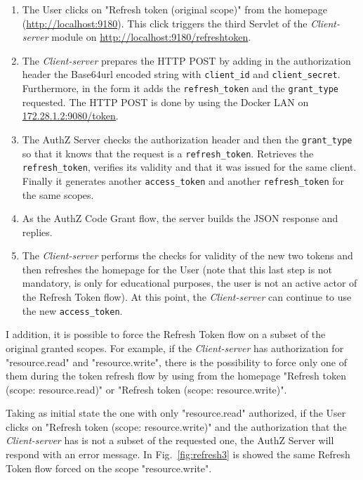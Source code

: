 \begin{enumerate}
    \item The User clicks on "Refresh token (original scope)" from the homepage (\url{http://localhost:9180}). This click triggers the third Servlet of the \textit{Client-server} module on \url{http://localhost:9180/refreshtoken}.
    \item The \textit{Client-server} prepares the HTTP POST by adding in the authorization header the Base64url encoded string with \texttt{client\_id} and \texttt{client\_secret}. Furthermore, in the form it adds the \texttt{refresh\_token} and the \texttt{grant\_type} requested. The HTTP POST is done by using the Docker LAN on \url{172.28.1.2:9080/token}.
    \item The AuthZ Server checks the authorization header and then the \texttt{grant\_type} so that it knows that the request is a \texttt{refresh\_token}. Retrieves the \texttt{refresh\_token}, verifies its validity and that it was issued for the same client. Finally it generates another \texttt{access\_token} and another \texttt{refresh\_token} for the same scopes.
    \item As the AuthZ Code Grant flow, the server builds the JSON response and replies.
    \item The \textit{Client-server} performs the checks for validity of the new two tokens and then refreshes the homepage for the User (note that this last step is not mandatory, is only for educational purposes, the user is not an active actor of the Refresh Token flow). At this point, the \textit{Client-server} can continue to use the new \texttt{access\_token}.
\end{enumerate}

I addition, it is possible to force the Refresh Token flow on a subset of the original granted scopes. For example, if the \textit{Client-server} has authorization for "resource.read" and "resource.write", there is the possibility to force only one of them during the token refresh flow by using from the homepage "Refresh token (scope: resource.read)" or "Refresh token (scope: resource.write)". 

Taking as initial state the one with only "resource.read" authorized, if the User clicks on "Refresh token (scope: resource.write)" and the authorization that the \textit{Client-server} has is not a subset of the requested one, the AuthZ Server will respond with an error message. In Fig.~\ref{fig:refresh3} is showed the same Refresh Token flow forced on the scope "resource.write". 

